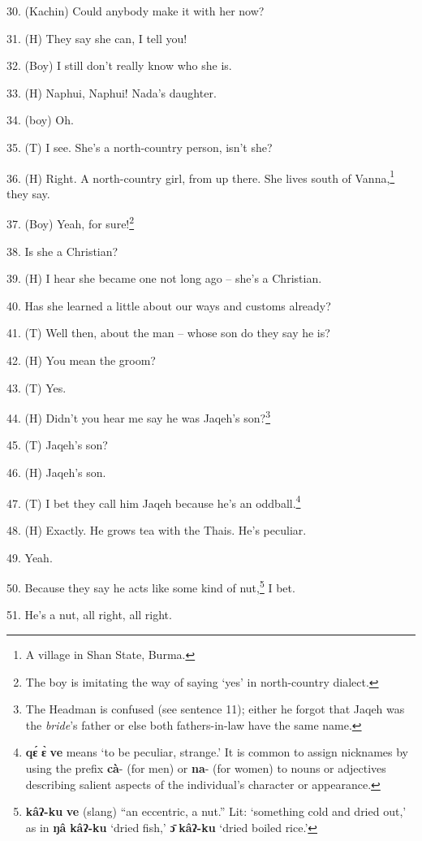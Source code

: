30. (Kachin) Could anybody make it with her now?


31. (H) They say she can, I tell you!

32. (Boy) I still don't really know who she is.

33. (H) Naphui, Naphui! Nada's daughter.

34. (boy) Oh.

35. (T) I see. She's a north-country person, isn't she?

36. (H) Right. A north-country girl, from up there. She lives south of Vanna,\footnote{A village in Shan State, Burma.}
they say.

37. (Boy) Yeah, for sure!\footnote{The boy is imitating the way of saying `yes' in north-country dialect.}

38. Is she a Christian?

39. (H) I hear she became one not long ago -- she's a Christian.

40. Has she learned a little about our ways and customs already?

41. (T) Well then, about the man -- whose son do they say he is?

42. (H) You mean the groom?

43. (T) Yes.

44. (H) Didn't you hear me say he was Jaqeh's son?\footnote{The Headman is confused (see sentence 11); either he forgot that Jaqeh was the \textit{bride}'s father or else both fathers-in-law have the same name.}

45. (T) Jaqeh's son?

46. (H) Jaqeh's son.

47. (T) I bet they call him Jaqeh because he's an oddball.\footnote{\textbf{qɛ́} \textbf{ɛ̀} \textbf{ve} means `to be peculiar, strange.' It is common to assign nicknames by using the prefix \textbf{cà}- (for men) or \textbf{na}- (for women) to nouns or adjectives describing salient aspects of the individual's character or appearance.}

48. (H) Exactly. He grows tea with the Thais. He's peculiar.

49. Yeah.

50. Because they say he acts like some kind of nut,\footnote{\textbf{kâʔ-ku} \textbf{ve} (slang) ``an eccentric, a nut.'' Lit: `something cold and dried out,' as in \textbf{ŋâ} \textbf{kâʔ-ku} `dried fish,' \textbf{ɔ̄} \textbf{kâʔ-ku} `dried boiled rice.'} I bet.

51. He's a nut, all right, all right.

